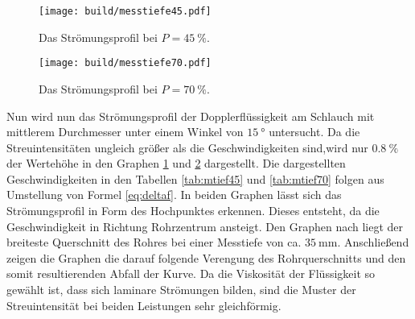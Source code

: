 \begin{figure}
 \centering
 \caption{Das Strömungsprofil bei $P = \SI{45}{\percent}$.}
 \texttt{[image: build/messtiefe45.pdf]}
 \label{fig:P45}
\end{figure}

\begin{figure}
 \centering
 \caption{Das Strömungsprofil bei $P = \SI{70}{\percent}$.}
 \texttt{[image: build/messtiefe70.pdf]}
 \label{fig:P70}
\end{figure}



Nun wird nun das Strömungsprofil der Dopplerflüssigkeit am Schlauch mit mittlerem
Durchmesser unter einem Winkel von $\SI{15}{\degree}$ untersucht. Da die Streuintensitäten ungleich größer als die Geschwindigkeiten
sind,wird nur $\SI{0.8}{\percent}$ der Wertehöhe in den Graphen \ref{fig:P45} und \ref{fig:P70} dargestellt. Die
dargestellten Geschwindigkeiten in den Tabellen \ref{tab:mtief45} und \ref{tab:mtief70} folgen aus Umstellung von Formel \ref{eq:deltaf}.
 In beiden Graphen lässt sich das Strömungsprofil in Form des Hochpunktes erkennen. Dieses
 entsteht, da die Geschwindigkeit in Richtung Rohrzentrum ansteigt. Den Graphen nach liegt
 der breiteste Querschnitt des Rohres bei einer Messtiefe von ca. $\SI{35}{\milli\meter}$.
 Anschließend zeigen die Graphen die darauf folgende Verengung des Rohrquerschnitts
 und den somit resultierenden Abfall der Kurve. Da die Viskosität der Flüssigkeit so
 gewählt ist, dass sich laminare Strömungen bilden, sind die Muster der Streuintensität
 bei beiden Leistungen sehr gleichförmig.
